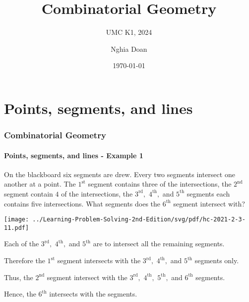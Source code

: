 \documentclass[8pt,xcolor=table,dvipsnames]{beamer}
\title{Combinatorial Geometry}
\subtitle{UMC K1, 2024}
\author{Nghia Doan}
\institute{MCC Club \& Competitions}
\date{\today}
\begin{document}
\section{Points, segments, and lines}

\begin{frame}[t]
    \frametitle{Combinatorial Geometry}
    \framesubtitle{Points, segments, and lines - Example 1}
    \begin{example}[HC-2021-SM2-R3-P11]
        On the blackboard six segments are drew. Every two segments intersect one another at a point.
        The $1^{\text{st}}$ segment contains three of the intersections, the $2^{\text{nd}}$ segment contain $4$ of the intersections,
        the $3^{\text{rd}},$ $4^{\text{th}},$ and $5^{\text{th}}$ segments each contains five intersections.
        What segments does the $6^{\text{th}}$ segment intersect with?
    \end{example}
    
    \begin{center}
        \texttt{[image: ../Learning-Problem-Solving-2nd-Edition/svg/pdf/hc-2021-2-3-11.pdf]}
    \end{center}

    Each of the $3^{\text{rd}},$ $4^{\text{th}},$ and $5^{\text{th}}$ are to intersect all the remaining segments.

    Therefore the $1^{\text{st}}$ segment intersects with the $3^{\text{rd}},$ $4^{\text{th}},$ and $5^{\text{th}}$ segments only.
    
    Thus, the $2^{\text{nd}}$ segment intersect with the $3^{\text{rd}},$ $4^{\text{th}},$ $5^{\text{th}},$ and $6^{\text{th}}$ segments.

    Hence, the $6^{\text{th}}$ intersects with the  segments.
\end{frame}
\end{document}

